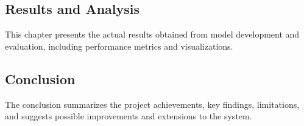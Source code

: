         \subsection{Results and Analysis}
            This chapter presents the actual results obtained from model development and evaluation, including performance metrics and visualizations.

        \subsection{Conclusion}
            The conclusion summarizes the project achievements, key findings, limitations, and suggests possible improvements and extensions to the system.